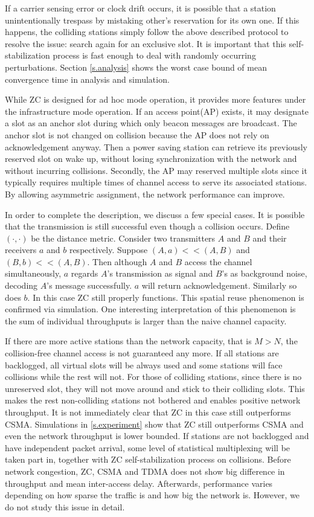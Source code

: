 \documentclass{acm_proc_article-sp}
\begin{document}
If a carrier sensing error or clock drift occurs, it is possible that a station unintentionally trespass by mistaking other's reservation for its own one. If this happens, the colliding stations simply follow the above described protocol to resolve the issue: search again for an exclusive slot. It is important that this self-stabilization process is fast enough to deal with randomly occurring perturbations. Section \ref{s.analysis} shows the worst case bound of mean convergence time in analysis and simulation.

While ZC is designed for ad hoc mode operation, it provides more features under the infrastructure mode operation. If an access point(AP) exists, it may designate a slot as an anchor slot during which only beacon messages are broadcast. The anchor slot is not changed on collision because the AP does not rely on acknowledgement anyway. Then a power saving station can retrieve its previously reserved slot on wake up, without losing synchronization with the network and without incurring collisions. Secondly, the AP may reserved multiple slots since it typically requires multiple times of channel access to serve its associated stations. By allowing asymmetric assignment, the network performance can improve.


In order to complete the description, we discuss a few special cases.
It is possible that the transmission is still successful even though a collision occurs. Define $(\cdot, \cdot)$ be the distance metric. Consider two transmitters $A$ and $B$ and their receivers $a$ and $b$ respectively. Suppose $(A,a) << (A,B)$ and $(B,b) << (A,B)$. Then although $A$ and $B$ access the channel simultaneously, $a$ regards $A$'s transmission as signal and $B$'s as background noise, decoding $A$'s message successfully. $a$ will return acknowledgement. Similarly so does $b$. In this case ZC still properly functions. This spatial reuse phenomenon is confirmed via simulation. One interesting interpretation of this phenomenon is the sum of individual throughputs is larger than the naive channel capacity.

If there are more active stations than the network capacity, that is $M > N$, the collision-free channel access is not guaranteed any more. If all stations are backlogged, all virtual slots will be always used and some stations will face collisions while the rest will not. For those of colliding stations, since there is no unreserved slot, they will not move around and stick to their colliding slots. This makes the rest non-colliding stations not bothered and enables positive network throughput. It is not immediately clear that ZC in this case still outperforms CSMA. Simulations in \ref{s.experiment} show that ZC still outperforms CSMA and even the network throughput is lower bounded.
If stations are not backlogged and have independent packet arrival, some level of statistical multiplexing will be taken part in, together with ZC self-stabilization process on collisions.
Before network congestion, ZC, CSMA and TDMA does not show big difference in throughput and mean inter-access delay. Afterwards, performance varies depending on how sparse the traffic is and how big the network is. However, we do not study this issue in detail.
\end{document}
